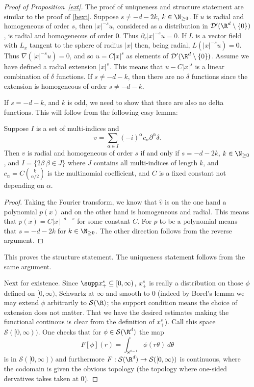 \documentclass[12pt]{article}
\begin{document}
\begin{proof}[Proof of Proposition~\ref{ext}]The proof of uniqueness and structure statement are similar to the proof of \ref{bext}. Suppose $s \neq -d-2k$, $k \in \N_{\geq 0}$. If $u$ is radial and homogeneous of order $s$, then $|x|^{-s}u$, considered as a distribution in $\mathcal D'(\R^d\setminus\{0\})$, is radial and homogeneous of order $0$. Thus $\partial_r |x|^{-s}u = 0$. If $L$ is a vector field with $L_x$ tangent to the sphere of radius $|x|$ then, being radial, $L (|x|^{-s}u) = 0$. Thus $\nabla (|x|^{-s}u) = 0$, and so $u = C|x|^s$ as elements of $\mathcal D'(\R^d\setminus\{0\})$. Assume we have defined a radial extension $|x|^s$. This means that $u-C|x|^s$ is a linear combination of $\delta$ functions. If $s \neq -d-k$, then there are no $\delta$ functions since the extension is homogeneous of order $s \neq -d-k$.

 If $s =-d-k$, and $k$ is odd, we need to show that there are also no delta functions. This will follow from the following easy lemma:
 \begin{lem}Suppose $I$ is a set of multi-indices and \[v = \sum_{\alpha \in I} (-i)^{\alpha}c_\alpha\partial^{\alpha}\delta.\] Then $v$ is radial and homogeneous of order $s$ if and only if $s = -d-2k$, $k \in \N_{\geq 0}$, and $I = \{2\beta \: \beta \in J\}$ where $J$ contains all multi-indices of length $k$, and $c_\alpha = C{k \choose \alpha/2}$ is the multinomial coefficient, and $C$ is a fixed constant not depending on $\alpha$.\end{lem}
\begin{proof}Taking the Fourier transform, we know that $\widehat{v}$ is on the one hand a polynomial $p(x)$ and on the other hand is homogeneous and radial. This means that $p(x) = C|x|^{-d-s}$ for some constant $C$. For $p$ to be a polynomial means that $s = -d-2k$ for $k \in \N_{\geq 0}$. The other direction follows from the reverse argument.\end{proof}
This proves the structure statement. The uniqueness statement follows from the same argument.

Next for existence. Since $\supp x_+^s \subseteq [0,\infty)$, $x_+^s$ is really a distribution on those $\phi$ defined on $[0,\infty)$, Schwartz at $\infty$ and smooth to $0$ (indeed by Borel's lemma we may extend $\phi$ arbitrarily to $\mathcal S(\R)$; the support condition means the choice of extension does not matter. That we have the desired estimates making the functional continous is clear from the definition of $x_+^s$). Call this space $\mathcal S([0,\infty))$. One checks that for $\phi \in \mathcal S(\R^d)$ the map
\[F[\phi](r) = \int_{S^{d-1}} \phi(r\theta)\ d\theta\] is in $\mathcal S([0,\infty))$ and furthermore $F:\mathcal S(\R^d) \to \mathcal S([0,\infty))$ is continuous, where the codomain is given the obvious topology (the topology where one-sided dervatives takes taken at $0$). 


\end{proof}
\end{document}
